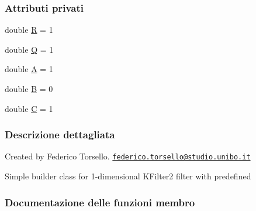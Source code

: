 \subsubsection*{Attributi privati}
\begin{DoxyCompactItemize}
\item 
double \hyperlink{classit_1_1unibo_1_1torsello_1_1bluetoothpositioning_1_1filters_1_1kalmanFilter_1_1KFilterBuilder_a524dd60c1b39f891abd153c802a35056_a524dd60c1b39f891abd153c802a35056}{R} = 1
\item 
double \hyperlink{classit_1_1unibo_1_1torsello_1_1bluetoothpositioning_1_1filters_1_1kalmanFilter_1_1KFilterBuilder_a96a8b30ce4611c94928a103f5d03bae2_a96a8b30ce4611c94928a103f5d03bae2}{Q} = 1
\item 
double \hyperlink{classit_1_1unibo_1_1torsello_1_1bluetoothpositioning_1_1filters_1_1kalmanFilter_1_1KFilterBuilder_ad93db15bf28d834081e9fb3df0daad9a_ad93db15bf28d834081e9fb3df0daad9a}{A} = 1
\item 
double \hyperlink{classit_1_1unibo_1_1torsello_1_1bluetoothpositioning_1_1filters_1_1kalmanFilter_1_1KFilterBuilder_a34d29c926b790a773f8f74bfd72e1f56_a34d29c926b790a773f8f74bfd72e1f56}{B} = 0
\item 
double \hyperlink{classit_1_1unibo_1_1torsello_1_1bluetoothpositioning_1_1filters_1_1kalmanFilter_1_1KFilterBuilder_a810bcf844c3b33ba4befbe4ae2698488_a810bcf844c3b33ba4befbe4ae2698488}{C} = 1
\end{DoxyCompactItemize}


\subsubsection{Descrizione dettagliata}
Created by Federico Torsello. \href{mailto:federico.torsello@studio.unibo.it}{\tt federico.\+torsello@studio.\+unibo.\+it} 

Simple builder class for 1-\/dimensional K\+Filter2 filter with predefined 

\subsubsection{Documentazione delle funzioni membro}
\hypertarget{classit_1_1unibo_1_1torsello_1_1bluetoothpositioning_1_1filters_1_1kalmanFilter_1_1KFilterBuilder_a02fafb90d237636696c0d6a4ace2b2fb_a02fafb90d237636696c0d6a4ace2b2fb}{}\label{classit_1_1unibo_1_1torsello_1_1bluetoothpositioning_1_1filters_1_1kalmanFilter_1_1KFilterBuilder_a02fafb90d237636696c0d6a4ace2b2fb_a02fafb90d237636696c0d6a4ace2b2fb} 
